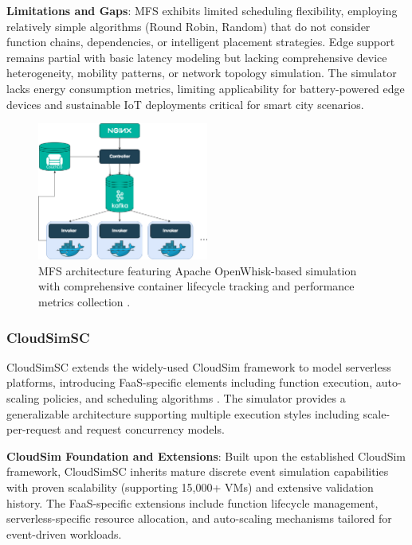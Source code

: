 \textbf{Limitations and Gaps}: MFS exhibits limited scheduling flexibility, employing relatively simple algorithms (Round Robin, Random) that do not consider function chains, dependencies, or intelligent placement strategies. Edge support remains partial with basic latency modeling but lacking comprehensive device heterogeneity, mobility patterns, or network topology simulation. The simulator lacks energy consumption metrics, limiting applicability for battery-powered edge devices and sustainable IoT deployments critical for smart city scenarios.

\begin{figure}[htbp]
\centering
\includegraphics[width=0.5\textwidth]{assets/Apache OpenWhisk architecture.png}
\caption{MFS architecture featuring Apache OpenWhisk-based simulation with comprehensive container lifecycle tracking and performance metrics collection \cite{bermbach2019mfs, banaei2022etas}.}
\label{fig:mfs-architecture}
\end{figure}

\subsubsection{CloudSimSC}

CloudSimSC extends the widely-used CloudSim framework to model serverless platforms, introducing FaaS-specific elements including function execution, auto-scaling policies, and scheduling algorithms \cite{mampage2021cloudsimsc}. The simulator provides a generalizable architecture supporting multiple execution styles including scale-per-request and request concurrency models.

\textbf{CloudSim Foundation and Extensions}: Built upon the established CloudSim framework, CloudSimSC inherits mature discrete event simulation capabilities with proven scalability (supporting 15,000+ VMs) and extensive validation history. The FaaS-specific extensions include function lifecycle management, serverless-specific resource allocation, and auto-scaling mechanisms tailored for event-driven workloads.

